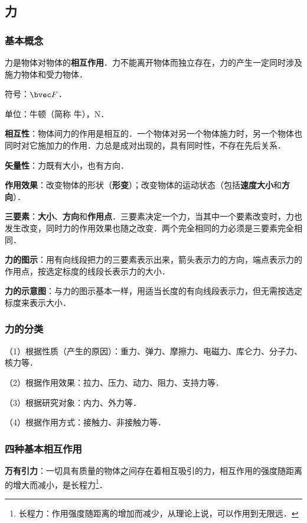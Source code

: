 

\subsection{力}
\subsubsection{基本概念}
力是物体对物体的\textbf{相互作用}．力不能离开物体而独立存在，力的产生一定同时涉及施力物体和受力物体．

符号：$\bvec F$．

单位：牛顿（简称 牛），$\mathrm N$．

\textbf{相互性}：物体间力的作用是相互的．一个物体对另一个物体施力时，另一个物体也同时对它施加力的作用．力总是成对出现的，具有同时性，不存在先后关系．

\textbf{矢量性}：力既有大小，也有方向．

\textbf{作用效果}：改变物体的形状（\textbf{形变}）；改变物体的运动状态（包括\textbf{速度大小}和\textbf{方向}）．

\textbf{三要素}：\textbf{大小}、\textbf{方向}和\textbf{作用点}．三要素决定一个力，当其中一个要素改变时，力也发生改变，同时力的作用效果也随之改变．两个完全相同的力必须是三要素完全相同．

\textbf{力的图示}：用有向线段把力的三要素表示出来，箭头表示力的方向，端点表示力的作用点，按选定标度的线段长表示力的大小．

\textbf{力的示意图}：与力的图示基本一样，用适当长度的有向线段表示力，但无需按选定标度来表示大小．

\subsubsection{力的分类}
（1）根据性质（产生的原因）：重力、弹力、摩擦力、电磁力、库仑力、分子力、核力等．

（2）根据作用效果：拉力、压力、动力、阻力、支持力等．

（3）根据研究对象：内力、外力等．

（4）根据作用方式：接触力、非接触力等．

\subsubsection{四种基本相互作用}
\textbf{万有引力}：一切具有质量的物体之间存在着相互吸引的力，相互作用的强度随距离的增大而减小，是长程力\footnote{长程力：作用强度随距离的增加而减少，从理论上说，可以作用到无限远．}．

